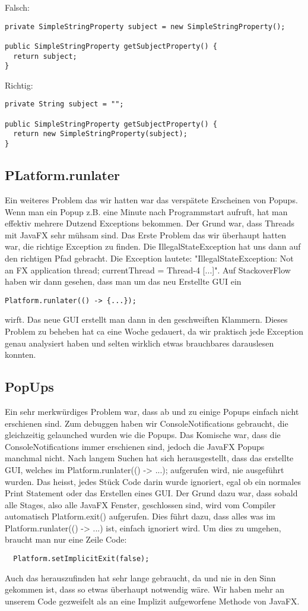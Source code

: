 \documentclass[11pt,titelpage]{scrartcl}
\begin{document}
Falsch:
\begin{lstlisting}
private SimpleStringProperty subject = new SimpleStringProperty();

public SimpleStringProperty getSubjectProperty() {
  return subject;
}
\end{lstlisting}

Richtig:
\begin{lstlisting}
private String subject = "";

public SimpleStringProperty getSubjectProperty() {
  return new SimpleStringProperty(subject);
}
\end{lstlisting}

\subsection{PLatform.runlater}
Ein weiteres Problem das wir hatten war das verspätete Erscheinen von Popups. Wenn man ein Popup z.B. eine Minute nach Programmstart aufruft, hat man effektiv mehrere Dutzend Exceptions bekommen.
Der Grund war, dass Threads mit JavaFX sehr mühsam sind. Das Erste Problem das wir überhaupt hatten war, die richtige Exception zu finden. Die IllegalStateException hat uns dann auf den richtigen Pfad gebracht.
Die Exception lautete: "IllegalStateException: Not an FX application thread; currentThread = Thread-4 [...]". Auf StackoverFlow haben wir dann gesehen, dass man um das neu Erstellte GUI ein
\begin{lstlisting}
Platform.runlater(() -> {...});
\end{lstlisting}
wirft. Das neue GUI erstellt man dann in den geschweiften Klammern.
Dieses Problem zu beheben hat ca eine Woche gedauert, da wir praktisch jede Exception genau analysiert haben und selten wirklich etwas brauchbares darauslesen konnten.
\subsection{PopUps}
Ein sehr merkwürdiges Problem war, dass ab und zu einige Popups einfach nicht erschienen sind. Zum debuggen haben wir ConsoleNotifications gebraucht, die gleichzeitig gelaunched wurden wie die Popups. Das Komische war, dass die ConsoleNotifications immer erschienen sind, jedoch die JavaFX Popups manchmal nicht. Nach langem Suchen hat sich herausgestellt,
dass das erstellte GUI, welches im Platform.runlater(() -> {...}); aufgerufen wird, nie ausgeführt wurden. Das heisst, jedes Stück Code darin wurde ignoriert, egal ob ein
normales Print Statement oder das Erstellen eines GUI. Der Grund dazu war, dass sobald alle Stages, also alle JavaFX Fenster, geschlossen sind, wird vom Compiler automatisch
Platform.exit() aufgerufen. Dies führt dazu, dass alles was im Platform.runlater(() -> {...}) ist, einfach ignoriert wird. Um dies zu umgehen, braucht man nur eine Zeile Code:
\begin{lstlisting}
  Platform.setImplicitExit(false);
\end{lstlisting}
Auch das herauszufinden hat sehr lange gebraucht, da und nie in den Sinn gekommen ist, dass so etwas überhaupt notwendig wäre. Wir haben mehr an unserem Code gezweifelt als an eine Implizit aufgeworfene Methode von JavaFX.
\end{document}
